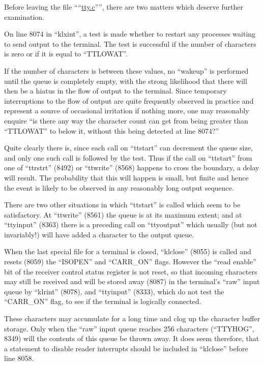 Before leaving the file ````\href{./v6/dmr/tty.c}{tty.c}'''', there
are two matters which deserve further
examination.


On line 8074 in ``klxint'', a test is
made whether to restart any processes
waiting to send output to the terminal.
The test is successful if the number of
characters is zero or if it is equal to
``TTLOWAT''.

If the number of characters is between
these values, no ``wakeup'' is performed
until the queue is completely empty,
with the strong likelihood that there
will then be a hiatus in the flow of
output to the terminal. Since temporary interruptions to the flow of
output are quite frequently observed in
practice and represent a source of
occasional irritation if nothing more,
one may reasonably enquire ``is there
any way the character count can get
from being greater than ``TTLOWAT'' to
below it, without this being detected
at line 8074?''

Quite clearly there is, since each call
on ``ttstart'' can decrement the queue
size, and only one such call is followed by the test. Thus if the call on
``ttstart'' from one of ``ttrstrt'' (8492)
or ``ttwrite'' (8568) happens to cross
the boundary, a delay will result. The
probability that this will happen is
small, but finite and hence the event
is likely to be observed in any reasonably long output sequence.

There are two other situations in which
``ttstart'' is called which seem to be
satisfactory. At ``ttwrite'' (8561) the
queue is at its maximum extent; and at
``ttyinput'' (8363) there is a preceding
call on ``ttyoutput'' which usually (but
not invariably!) will have added a
character to the output queue.


When the last special file for a terminal is closed, ``klclose'' (8055) is
called and resets (8059) the ``ISOPEN''
and ``CARR\_ON'' flags. However the ``read
enable'' bit of the receiver control
status register is not reset, so that
incoming characters may still be
received and will be stored away (8087)
in the terminal's ``raw'' input queue by
``klrint'' (8078), and ``ttyinput'' (8333),
which do not test the ``CARR\_ON'' flag,
to see if the terminal is logically
connected.

These characters may accumulate for a
long time and clog up the character
buffer storage. Only when the ``raw''
input queue reaches 256 characters
(``TTYHOG'', 8349) will the contents of
this queue be thrown away. It does seem
therefore, that a statement to disable
reader interrupts should be included in
``klclose'' before line 8058.

